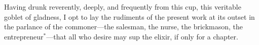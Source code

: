 Having drunk reverently, deeply, and frequently from this cup, this
veritable goblet of gladness, I opt to lay the rudiments of the
present work at its outset in the parlance of the commoner---the
salesman, the nurse, the brickmason, the entrepreneur$^*$---that all
who desire may sup the elixir, if only for a chapter.




    
% 
% 
